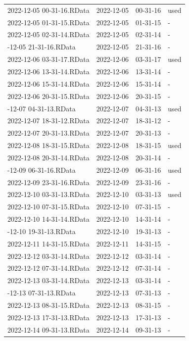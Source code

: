 \documentclass[
  letterpaper,
  DIV=11,
  numbers=noendperiod]{scrartcl}
\begin{document}
\begin{table}
\begin{tabular}{llll}
2022-12-05 00-31-16.RData & 2022-12-05 & 00-31-16 & used\\
2022-12-05 01-31-15.RData & 2022-12-05 & 01-31-15 & -\\
2022-12-05 02-31-14.RData & 2022-12-05 & 02-31-14 & -\\
\addlinespace
2022-12-05 21-31-16.RData & 2022-12-05 & 21-31-16 & -\\
2022-12-06 03-31-17.RData & 2022-12-06 & 03-31-17 & used\\
2022-12-06 13-31-14.RData & 2022-12-06 & 13-31-14 & -\\
2022-12-06 15-31-14.RData & 2022-12-06 & 15-31-14 & -\\
2022-12-06 20-31-15.RData & 2022-12-06 & 20-31-15 & -\\
\addlinespace
2022-12-07 04-31-13.RData & 2022-12-07 & 04-31-13 & used\\
2022-12-07 18-31-12.RData & 2022-12-07 & 18-31-12 & -\\
2022-12-07 20-31-13.RData & 2022-12-07 & 20-31-13 & -\\
2022-12-08 18-31-15.RData & 2022-12-08 & 18-31-15 & used\\
2022-12-08 20-31-14.RData & 2022-12-08 & 20-31-14 & -\\
\addlinespace
2022-12-09 06-31-16.RData & 2022-12-09 & 06-31-16 & used\\
2022-12-09 23-31-16.RData & 2022-12-09 & 23-31-16 & -\\
2022-12-10 03-31-13.RData & 2022-12-10 & 03-31-13 & used\\
2022-12-10 07-31-15.RData & 2022-12-10 & 07-31-15 & -\\
2022-12-10 14-31-14.RData & 2022-12-10 & 14-31-14 & -\\
\addlinespace
2022-12-10 19-31-13.RData & 2022-12-10 & 19-31-13 & -\\
2022-12-11 14-31-15.RData & 2022-12-11 & 14-31-15 & -\\
2022-12-12 03-31-14.RData & 2022-12-12 & 03-31-14 & -\\
2022-12-12 07-31-14.RData & 2022-12-12 & 07-31-14 & -\\
2022-12-13 03-31-14.RData & 2022-12-13 & 03-31-14 & -\\
\addlinespace
2022-12-13 07-31-13.RData & 2022-12-13 & 07-31-13 & -\\
2022-12-13 08-31-15.RData & 2022-12-13 & 08-31-15 & -\\
2022-12-13 17-31-13.RData & 2022-12-13 & 17-31-13 & -\\
2022-12-14 09-31-13.RData & 2022-12-14 & 09-31-13 & -\\

\end{tabular}
\end{table}
\end{document}
